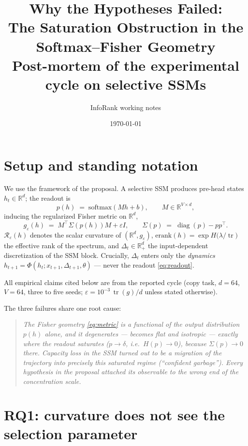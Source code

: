 \documentclass[11pt,a4paper]{article}
\title{\textbf{Why the Hypotheses Failed:\\ The Saturation Obstruction in the Softmax--Fisher Geometry}\\[1ex]
\large Post-mortem of the experimental cycle on selective SSMs}
\author{InfoRank working notes}
\date{\today}
\theoremstyle{definition}
\theoremstyle{remark}
\begin{document}
\maketitle

\section{Setup and standing notation}

We use the framework of the proposal. A selective SSM produces pre-head states
$h_t \in \mathbb{R}^d$; the readout is
\begin{equation}
p(h) \;=\; \mathrm{softmax}(Mh+b), \qquad M \in \mathbb{R}^{V\times d},
\label{eq:readout}
\end{equation}
inducing the regularized Fisher metric on $\mathbb{R}^d$,
\begin{equation}
g_\varepsilon(h) \;=\; M^\top \Sigma\!\left(p(h)\right) M + \varepsilon I,
\qquad
\Sigma(p) \;=\; \operatorname{diag}(p) - pp^\top .
\label{eq:metric}
\end{equation}
$\mathcal{R}_\varepsilon(h)$ denotes the scalar curvature of $(\mathbb{R}^d, g_\varepsilon)$,
$\mathrm{erank}(h) = \exp H\!\big(\lambda/\operatorname{tr}\big)$ the effective rank of the spectrum,
and $\Delta_t \in \mathbb{R}^d_+$ the input-dependent discretization of the SSM block. Crucially,
$\Delta_t$ enters only the \emph{dynamics} $h_{t+1} = \Phi(h_t; x_{t+1}, \Delta_{t+1}, \theta)$ ---
never the readout \eqref{eq:readout}.

All empirical claims cited below are from the reported cycle (copy task, $d = 64$, $V = 64$, three to
five seeds; $\varepsilon = 10^{-3}\,\operatorname{tr}(g)/d$ unless stated otherwise).

The three failures share one root cause:

\begin{quote}
\emph{The Fisher geometry \eqref{eq:metric} is a functional of the output distribution $p(h)$
alone, and it degenerates --- becomes flat and isotropic --- exactly where the readout saturates
($p \to \delta$, i.e.\ $H(p) \to 0$), because $\Sigma(p) \to 0$ there. Capacity loss in the SSM
turned out to be a migration of the trajectory into precisely this saturated regime
(``confident garbage''). Every hypothesis in the proposal attached its observable to the wrong end
of the concentration scale.}
\end{quote}

\section{RQ1: curvature does not see the selection parameter}
\end{document}
